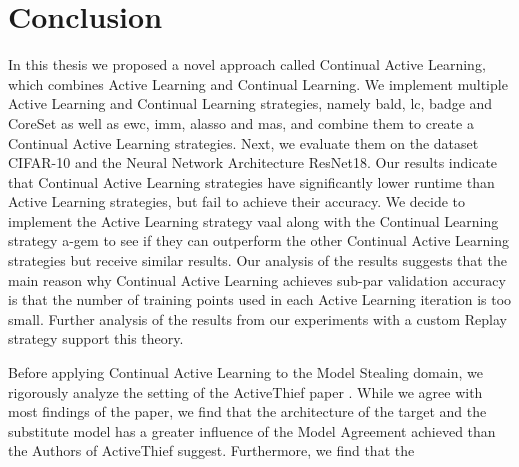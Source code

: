 
\chapter{Conclusion}
\label{ch:Conclusion}
In this thesis we proposed a novel approach called Continual Active Learning, which combines Active Learning and Continual Learning. 
We implement multiple Active Learning and Continual Learning strategies, namely \gls{bald}, \gls{lc}, \gls{badge} and CoreSet as well
as \gls{ewc}, \gls{imm}, \gls{alasso} and \gls{mas}, and combine them to create a Continual Active Learning strategies. Next, we 
evaluate them on the dataset CIFAR-10 and the Neural Network Architecture ResNet18. Our results indicate that Continual Active Learning
strategies have significantly lower runtime than Active Learning strategies, but fail to achieve their accuracy. We decide to implement
the Active Learning strategy \gls{vaal} along with the Continual Learning strategy \gls{a-gem} to see if they can outperform the other
Continual Active Learning strategies but receive similar results. Our analysis of the results suggests that the main reason why Continual
Active Learning achieves sub-par validation accuracy is that the number of training points used in each Active Learning iteration is too
small. Further analysis of the results from our experiments with a custom Replay strategy support this theory. \par
Before applying Continual Active Learning to the Model Stealing domain, we rigorously analyze the setting of the ActiveThief paper
\cite{pal2020activethief}. While we agree with most findings of the paper, we find that the architecture of the target and the substitute
model has a greater influence of the Model Agreement achieved than the Authors of ActiveThief suggest. Furthermore, we find that the
